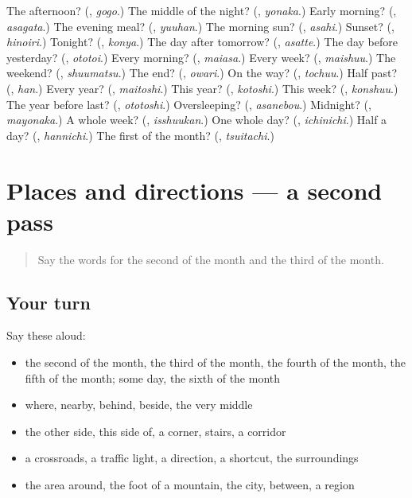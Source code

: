 \begin{tcolorbox}[breakable,colback=teal!4,colframe=teal!35!black,title={Before you move on}]
The afternoon? (\textbf{}, \emph{gogo}.) The middle of the night? (\textbf{}, \emph{yonaka}.) Early morning? (\textbf{}, \emph{asagata}.) The evening meal? (\textbf{}, \emph{yuuhan}.) The morning sun? (\textbf{}, \emph{asahi}.) Sunset? (\textbf{}, \emph{hinoiri}.) Tonight? (\textbf{}, \emph{konya}.) The day after tomorrow? (\textbf{}, \emph{asatte}.) The day before yesterday? (\textbf{}, \emph{ototoi}.) Every morning? (\textbf{}, \emph{maiasa}.) Every week? (\textbf{}, \emph{maishuu}.) The weekend? (\textbf{}, \emph{shuumatsu}.) The end? (\textbf{}, \emph{owari}.) On the way? (\textbf{}, \emph{tochuu}.) Half past? (\textbf{}, \emph{han}.) Every year? (\textbf{}, \emph{maitoshi}.) This year? (\textbf{}, \emph{kotoshi}.) This week? (\textbf{}, \emph{konshuu}.) The year before last? (\textbf{}, \emph{ototoshi}.) Oversleeping? (\textbf{}, \emph{asanebou}.) Midnight? (\textbf{}, \emph{mayonaka}.) A whole week? (\textbf{}, \emph{isshuukan}.) One whole day? (\textbf{}, \emph{ichinichi}.) Half a day? (\textbf{}, \emph{hannichi}.) The first of the month? (\textbf{}, \emph{tsuitachi}.)
\end{tcolorbox}
\section[(dialogue)]{Places and directions — a second pass}

\label{lesson:JA-R81-second-pass-places-and-directions}



\begin{quote}
Say the words for the second of the month and the third of the month.
\end{quote}

\subsection*{Your turn}
Say these aloud:

\begin{itemize}
\raggedright
  \item the second of the month, the third of the month, the fourth of the month, the fifth of the month; some day, the sixth of the month
  \item where, nearby, behind, beside, the very middle
  \item the other side, this side of, a corner, stairs, a corridor
  \item a crossroads, a traffic light, a direction, a shortcut, the surroundings
  \item the area around, the foot of a mountain, the city, between, a region
\end{itemize}

